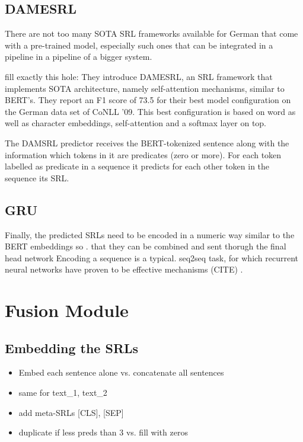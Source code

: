 \subsection{DAMESRL}

There are not too many SOTA SRL frameworks available for German that come with a pre-trained model,
especially such ones that can be integrated in a pipeline in a pipeline of a bigger system.

\cite{do2018flexible} fill exactly this hole: They introduce DAMESRL, an SRL framework that
implements SOTA architecture, namely self-attention mechanisms, similar to BERT's. They report
an F1 score of 73.5 for their best model configuration on the German data set of CoNLL '09.
This best configuration is based on word as well as character embeddings, self-attention and a
softmax layer on top.

The DAMSRL predictor receives the BERT-tokenized sentence along with the information which tokens
in it are predicates (zero or more). For each token labelled as predicate in a sequence it predicts
for each other token in the sequence its SRL.

\subsection{GRU}

Finally, the predicted SRLs need to be encoded in a numeric way similar to the BERT embeddings so .
that they can be combined and sent thorugh the final head network Encoding a sequence is a typical.
seq2seq task, for which recurrent neural networks have proven to be effective mechanisms (CITE)   .

\section{Fusion Module}

\subsection{Embedding the SRLs}

\begin{itemize}
	\item Embed each sentence alone vs. concatenate all sentences
	\item same for text\_1, text\_2
	\item add meta-SRLs [CLS], [SEP]
	\item duplicate if less preds than 3 vs. fill with zeros
\end{itemize}

